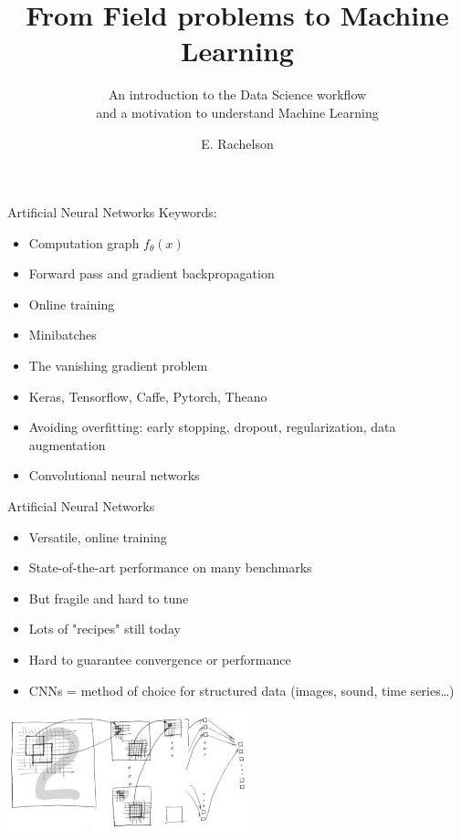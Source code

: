 \documentclass{beamer}
\title[A few topics in Reinforcement Learning]{From Field problems to Machine Learning}
\subtitle{An introduction to the Data Science workflow\\and a motivation to understand Machine Learning}
\author{E. Rachelson}
\institute{\texttt{[image: img/isae.jpg]}}
\date{}
\begin{document}
\begin{frame}{Artificial Neural Networks}
Keywords:
\begin{itemize}
\item Computation graph $f_\theta(x)$
\item Forward pass and gradient backpropagation
\item Online training
\item Minibatches
\item The vanishing gradient problem
\item Keras, Tensorflow, Caffe, Pytorch, Theano
\item Avoiding overfitting: early stopping, dropout, regularization, data augmentation
\item Convolutional neural networks
\end{itemize}
\end{frame}

\begin{frame}{Artificial Neural Networks}
\begin{itemize}
\item Versatile, online training
\item State-of-the-art performance on many benchmarks
\item But fragile and hard to tune
\item Lots of "recipes" still today
\item Hard to guarantee convergence or performance
\item CNNs = method of choice for structured data (images, sound, time series\ldots)
\end{itemize}
\begin{center}
\includegraphics[width=7cm]{img/IllustrationNeuralNet.pdf}
\end{center}
\end{frame}
\end{document}
